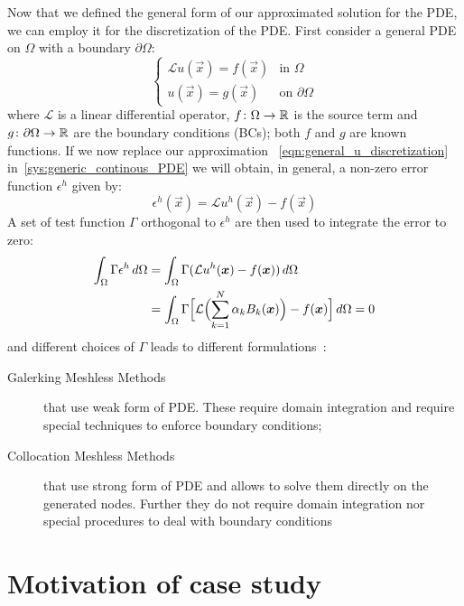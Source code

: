 Now that we defined the general form of our approximated solution for the PDE, we can employ it for the discretization of the PDE.
First consider a general PDE on $\Omega$ with a boundary $\partial\Omega$:
\begin{equation}
	\label{sys:generic_continous_PDE}
	\begin{cases}
		\mathcal{L} u(\vec{x})  = f(\vec{x})		& \text{in $\Omega$} \\
		u(\vec{x}) 							   = g(\vec{x})	 & \text{on $\partial\Omega$}
	\end{cases}
\end{equation}
where $\mathcal{L}$ is a linear differential operator, $f\colon\Omega\to\R$ is the source term  and $g\colon\partial\Omega\to\R$ are the boundary conditions (BCs); both $f$ and $g$ are known functions. If  we now replace our approximation ~\eqref{eqn:general_u_discretization} in~\eqref{sys:generic_continous_PDE} we will obtain, in general, a non-zero error function $\epsilon^{h}$ given by:
\begin{equation}
	\epsilon^{h}(\vec{x}) = \mathcal{L} u^{h}(\vec{x}) - f(\vec{x})
\end{equation}
A set of test function $\Gamma$ orthogonal to $\epsilon^{h}$ are then used to integrate the error to zero:
\begin{equation}
	\begin{split}
		\int_{\Omega} \Gamma \epsilon^{h}\,d\Omega & = \int_{\Omega} \Gamma (\mathcal{L} u^{h}(\vec{x}) - f(\vec{x}))\,d\Omega  \\
		& = \int_{\Omega} \Gamma \Bigl[ \mathcal{L}\Bigl( \sum_{k= 1}^{N} {\alpha_k B_k(\vec{x})}\Bigr) - f(\vec{x})\Bigr]\,d\Omega = 0
	\end{split}
\end{equation}
and different choices of $\Gamma$ leads to different formulations~\cite{Chen:meshless_overview_after_20_years}:
\begin{description}
	\item[Galerking Meshless Methods] that use weak form of PDE. These require domain integration and require special techniques to enforce boundary conditions;
	\item[Collocation Meshless Methods] that use strong form of PDE and allows to solve them directly on the generated nodes. Further they do not require domain integration nor special procedures to deal with boundary conditions
\end{description}


\section{Motivation of case study}

